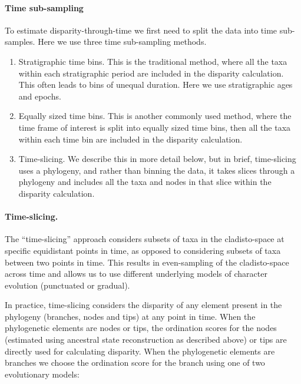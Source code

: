 \documentclass[12pt,a4paper]{article}
\begin{document}
\paragraph{Time sub-sampling} 
\label{time_sub-samples}

To estimate disparity-through-time we first need to split the data into time sub-samples.
Here we use three time sub-sampling methods.

\begin{enumerate}
  \item Stratigraphic time bins. This is the traditional method, where all the taxa within each stratigraphic period are included in the disparity calculation. This often leads to bins of unequal duration. Here we use stratigraphic ages and epochs.
  \item Equally sized time bins. This is another commonly used method, where the time frame of interest is split into equally sized time bins, then all the taxa within each time bin are included in the disparity calculation. 
  \item Time-slicing. We describe this in more detail below, but in brief, time-slicing uses a phylogeny, and rather than binning the data, it takes slices through a phylogeny and includes all the taxa and nodes in that slice within the disparity calculation. 
\end{enumerate}  

\paragraph{Time-slicing.} 
\label{time_slicing}
The ``time-slicing'' approach considers subsets of taxa in the cladisto-space at specific equidistant points in time, as opposed to considering subsets of taxa between two points in time.
This results in even-sampling of the cladisto-space across time and allows us to use different underlying models of character evolution (punctuated or gradual). 


In practice, time-slicing considers the disparity of any element present in the phylogeny (branches, nodes and tips) at any point in time.
When the phylogenetic elements are nodes or tips, the ordination scores for the nodes (estimated using ancestral state reconstruction as described above) or tips are directly used for calculating disparity.
When the phylogenetic elements are branches we choose the ordination score for the branch using one of two evolutionary models:
\end{document}
